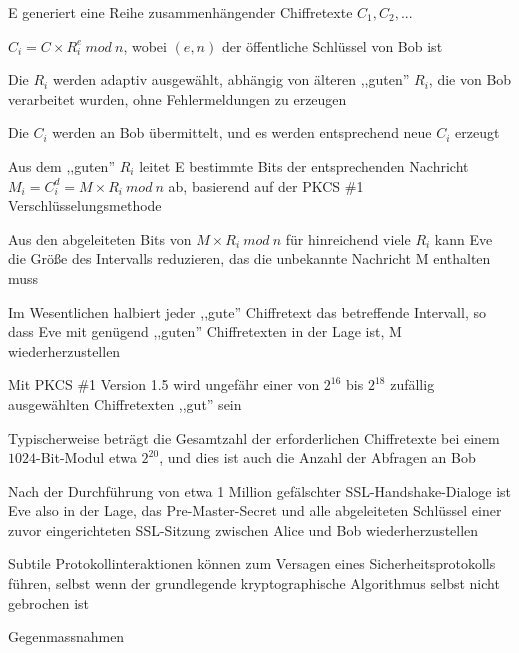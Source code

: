 \documentclass[a4paper]{article}
\begin{document}
\begin{multicols}{3}
\begin{itemize*}
\begin{itemize*}
                  \item E generiert eine Reihe zusammenhängender Chiffretexte $C_1 , C_2 , ...$
                  \begin{itemize*}
                        \item $C_i = C\times R_i^e\ mod\ n$, wobei $(e, n)$ der öffentliche Schlüssel von Bob ist
                        \item Die $R_i$ werden adaptiv ausgewählt, abhängig von älteren ,,guten'' $R_i$, die von Bob verarbeitet wurden, ohne Fehlermeldungen zu erzeugen %
                        \item Die $C_i$ werden an Bob übermittelt, und es werden entsprechend neue $C_i$ erzeugt
                        \item Aus dem ,,guten'' $R_i$ leitet E bestimmte Bits der entsprechenden Nachricht $M_i= C_i^d = M\times R_i\ mod\ n$ ab, basierend auf der PKCS \#1 Verschlüsselungsmethode
                  \end{itemize*}
                  \item Aus den abgeleiteten Bits von $M\times R_i\ mod\ n$ für hinreichend viele $R_i$ kann Eve die Größe des Intervalls reduzieren, das die unbekannte Nachricht M enthalten muss
                  \item Im Wesentlichen halbiert jeder ,,gute'' Chiffretext das betreffende Intervall, so dass Eve mit genügend ,,guten'' Chiffretexten in der Lage ist, M wiederherzustellen
                  \item Mit PKCS \#1 Version 1.5 wird ungefähr einer von $2^{16}$ bis $2^{18}$ zufällig ausgewählten Chiffretexten ,,gut'' sein
                  \item Typischerweise beträgt die Gesamtzahl der erforderlichen Chiffretexte bei einem $1024$-Bit-Modul etwa $2^{20}$, und dies ist auch die Anzahl der Abfragen an Bob
                  \item Nach der Durchführung von etwa 1 Million gefälschter SSL-Handshake-Dialoge ist Eve also in der Lage, das Pre-Master-Secret und alle abgeleiteten Schlüssel einer zuvor eingerichteten SSL-Sitzung zwischen Alice und Bob wiederherzustellen
                  \item Subtile Protokollinteraktionen können zum Versagen eines Sicherheitsprotokolls führen, selbst wenn der grundlegende kryptographische Algorithmus selbst nicht gebrochen ist
            \end{itemize*}
            \item Gegenmassnahmen

\end{itemize*}
\end{multicols}
\end{document}
